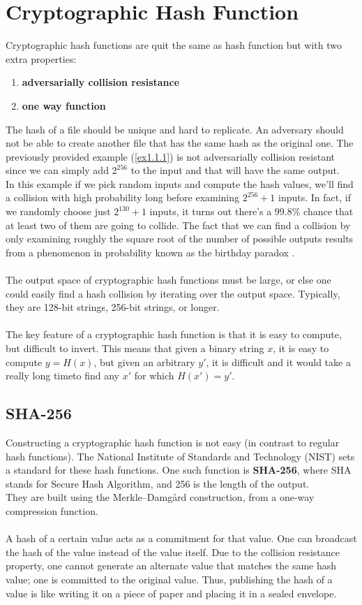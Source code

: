 \section{Cryptographic Hash Function}
Cryptographic hash functions are quit the same as hash function but with two extra properties:
\begin{enumerate}
	\item \textbf{adversarially collision resistance}
	\item \textbf{one way function}
\end{enumerate} 
The hash of a file should be unique and hard to replicate. An adversary should not be able to create another file that has the same hash as the original one. The previously provided example (\ref{ex1.1.1}) is not adversarially collision resistant since we can simply add $2^{256}$ to the input and that will have the same output.\\
In this example if we pick random inputs and compute the hash values, we’ll find a collision with high probability long before examining $2^{256} + 1$ inputs. In fact, if we randomly choose just $2^{130} + 1$ inputs, it turns out there’s a $99.8\%$ chance that at least two of them are going to collide. The fact that we can find a collision by only examining roughly the square root of the number of possible outputs results from a phenomenon in probability known as the birthday
paradox .\\\\
The output space of cryptographic hash functions must be large, or else one could easily find a hash collision by iterating over the output space. Typically, they are 128-bit strings, 256-bit strings, or longer.\\\\
The key feature of a cryptographic hash function is that it is easy to compute, but difficult to invert. This means that given a binary string $x$, it is easy to compute $y = H(x)$, but given an arbitrary $y'$, it is difficult and it would take a really long timeto find any $x'$ for which $H(x') = y'$.
\subsection*	{SHA-256}
Constructing a cryptographic hash function is not easy (in contrast to regular hash functions). The National Institute of Standards and Technology (NIST) sets a standard for these hash functions. One such function is \textbf{SHA-256}, where SHA stands for Secure Hash Algorithm, and 256 is the length of the output. \\
They are built using the Merkle–Damgård construction, from a one-way compression function.\\\\
A hash of a certain value acts as a commitment for that value.  One can broadcast the hash of the value instead of the value itself. Due to the collision resistance property, one cannot generate an alternate value that matches the same hash
value; one is committed to the original value. Thus, publishing the hash of a value is like writing it on a piece of paper and placing it in a sealed envelope.
